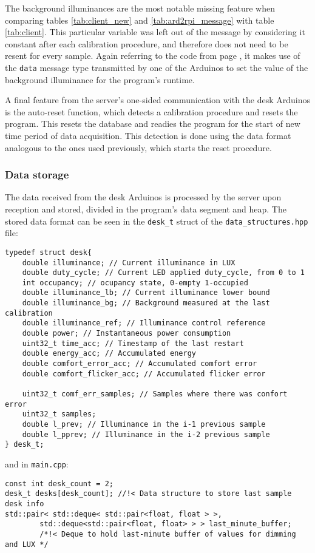 \documentclass[english,fira]{ist-report}
\begin{document}
The background illuminances are the most notable missing feature when comparing tables \ref{tab:client_new} and \ref{tab:ard2rpi_message} with table \ref{tab:client}. This particular variable was left out of the message by considering it constant after each calibration procedure, and therefore does not need to be resent for every sample. Again referring to the code from page \pageref{lis:dataformats}, it makes use of the \texttt{data} message type transmitted by one of the Arduinos to set the value of the background illuminance for the program's runtime.

A final feature from the server's one-sided communication with the desk Arduinos is the auto-reset function, which detects a calibration procedure and resets the program. This resets the database and readies the program for the start of new time period of data acquisition. This detection is done using the  data format analogous to the ones used previously, which starts the reset procedure.

\subsubsection{Data storage}

The data received from the desk Arduinos is processed by the server upon reception and stored, divided in the program's data segment and heap. The stored data format can be seen in the \texttt{desk\_t} struct of the \texttt{data\_structures.hpp} file:
\begin{verbatim}
typedef struct desk{
    double illuminance; // Current illuminance in LUX
    double duty_cycle; // Current LED applied duty_cycle, from 0 to 1
    int occupancy; // ocupancy state, 0-empty 1-occupied
    double illuminance_lb; // Current illuminance lower bound
    double illuminance_bg; // Background measured at the last calibration
    double illuminance_ref; // Illuminance control reference
    double power; // Instantaneous power consumption
    uint32_t time_acc; // Timestamp of the last restart
    double energy_acc; // Accumulated energy
    double comfort_error_acc; // Accumulated comfort error
    double comfort_flicker_acc; // Accumulated flicker error
    
    uint32_t comf_err_samples; // Samples where there was confort error
    uint32_t samples;
    double l_prev; // Illuminance in the i-1 previous sample
    double l_pprev; // Illuminance in the i-2 previous sample
} desk_t;
\end{verbatim}
and in \texttt{main.cpp}:
\begin{verbatim}
const int desk_count = 2;
desk_t desks[desk_count]; //!< Data structure to store last sample desk info
std::pair< std::deque< std::pair<float, float > >,
        std::deque<std::pair<float, float> > > last_minute_buffer; 
        /*!< Deque to hold last-minute buffer of values for dimming and LUX */
\end{verbatim}
\end{document}

